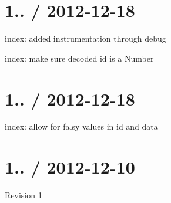 \section*{1.. / 2012-\/12-\/18 }


\begin{DoxyItemize}
\item index\+: added instrumentation through {\ttfamily debug}
\item index\+: make sure decoded {\ttfamily id} is a {\ttfamily Number}
\end{DoxyItemize}

\section*{1.. / 2012-\/12-\/18 }


\begin{DoxyItemize}
\item index\+: allow for falsy values in {\ttfamily id} and {\ttfamily data}
\end{DoxyItemize}

\section*{1.. / 2012-\/12-\/10 }


\begin{DoxyItemize}
\item Revision 1 
\end{DoxyItemize}